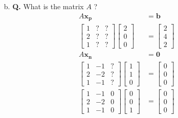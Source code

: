 \documentclass[main.tex]{subfiles}
\begin{document}
\begin{enumerate}
\begin{enumerate}
    \item [b.] \textbf{Q.} What is the matrix $A$ ? 
    $$
    \begin{aligned}
    A\bm{x_p} &= \bm{b}\\
    \left[\begin{array}{lll}
    1 & ? & ? \\
    2 & ? & ?\\
    1 & ? & ?
    \end{array}\right]\left[\begin{array}{l}
    2 \\
    0 \\
    0
    \end{array}\right] &= \left[\begin{array}{l}
    2 \\
    4 \\
    2
    \end{array}\right]\\
    A\bm{x_n} &= \bm{0} \\
    \left[\begin{array}{lll}
    1 & -1 & ? \\
    2 & -2 & ?\\
    1 & -1 & ?
    \end{array}\right]\left[\begin{array}{l}
    1 \\
    1 \\
    0
    \end{array}\right] &= \left[\begin{array}{l}
    0 \\
    0 \\
    0
    \end{array}\right]\\
    \left[\begin{array}{lll}
    1 & -1 & 0 \\
    2 & -2 & 0\\
    1 & -1 & 0
    \end{array}\right]\left[\begin{array}{l}
    0 \\
    0 \\
    1
    \end{array}\right] &= \left[\begin{array}{l}
    0 \\
    0 \\
    0
    \end{array}\right]\\
    \end{aligned}
    $$
    

\end{enumerate}
\end{enumerate}
\end{document}

